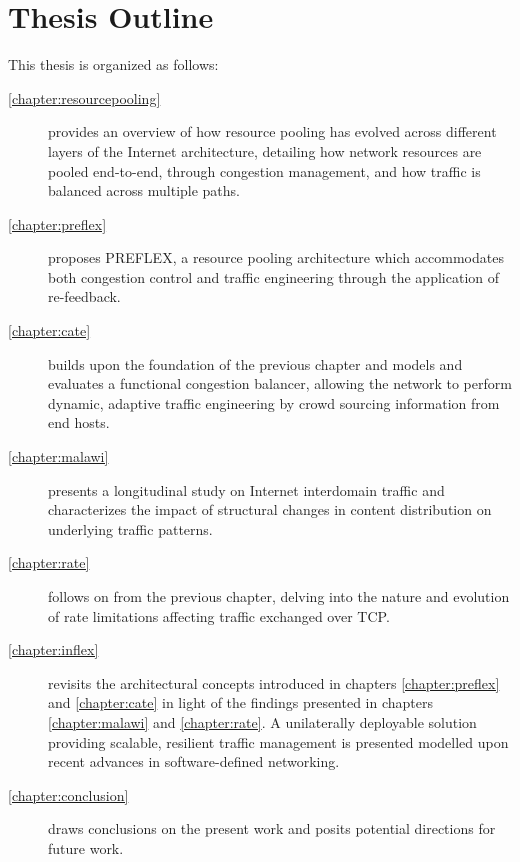 \section{Thesis Outline}
\label{sec:introduction:outline}

This thesis is organized as follows:

\renewcommand{\descriptionlabel}[1]{\hspace{\labelsep}\textbf{Chapter #1}}
\begin{description}
\item[\ref{chapter:resourcepooling}] provides an overview of how resource pooling has evolved across different layers of the Internet architecture, detailing how network resources are pooled end-to-end, through congestion management, and how traffic is balanced across multiple paths.
\item[\ref{chapter:preflex}] proposes \acs{PREFLEX}, a resource pooling architecture which accommodates both congestion control and traffic engineering through the application of re-feedback. 
\item[\ref{chapter:cate}] builds upon the foundation of the previous chapter and models and evaluates a functional congestion balancer, allowing the network to perform dynamic, adaptive traffic engineering by crowd sourcing information from end hosts.
\item[\ref{chapter:malawi}] presents a longitudinal study on Internet interdomain traffic and characterizes the impact of structural changes in content distribution on underlying traffic patterns.
\item[\ref{chapter:rate}] follows on from the previous chapter, delving into the nature and evolution of rate limitations affecting traffic exchanged over \ac{TCP}.
\item[\ref{chapter:inflex}] revisits the architectural concepts introduced in chapters \ref{chapter:preflex} and \ref{chapter:cate} in light of the findings presented in chapters \ref{chapter:malawi} and \ref{chapter:rate}.
A unilaterally deployable solution providing scalable, resilient traffic management is presented modelled upon recent advances in software-defined networking.
\item[\ref{chapter:conclusion}] draws conclusions on the present work and posits potential directions for future work.
\end{description}

